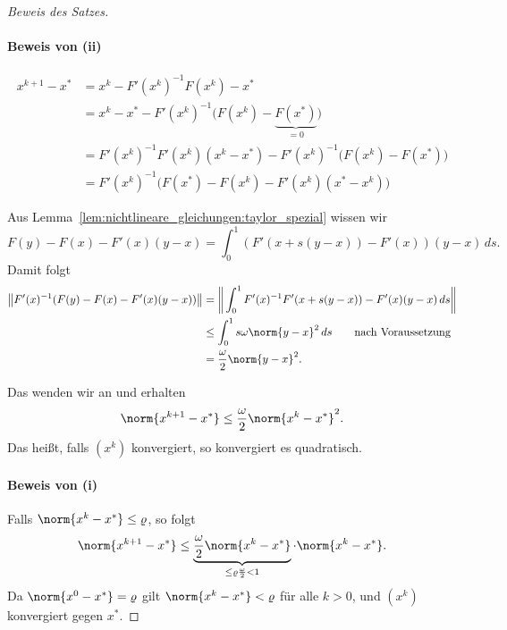 \begin{proof}[Beweis des Satzes]\mbox{}
\paragraph{Beweis von (ii)}
\begin{align*}
 x^{k+1}-x^*
 & =
 x^k- F'(x^k)^{-1} F(x^k) - x^* \\
 & =
 x^k-x^*-F'(x^k)^{-1} \Big(F(x^k)-\underbrace{F(x^*)}_{=0} \Big) \\
 & =
 F'(x^k)^{-1} F'(x^k) (x^k-x^*) - F'(x^k)^{-1} \big(F(x^k)-F(x^*) \big) \\
 & =
 F'(x^k)^{-1} \Big(F(x^*) - F(x^k) - F'(x^k) (x^*-x^k) \Big)
\end{align*}

Aus Lemma~\ref{lem:nichtlineare_gleichungen:taylor_spezial} wissen wir
\begin{equation*}
 F(y)-F(x)-F'(x)(y-x) = \int_0^1 (F'(x+s(y-x))-F'(x) )(y-x)\,ds.
\end{equation*}
Damit folgt
\begin{align*}
 \big \Vert F'(x)^{-1} (F(y)-F(x)- F'(x)(y-x) ) \big \Vert
 & =
 \bigg \Vert \int_0^1 F'(x)^{-1} F'(x+s (y-x))-F'(x) (y-x) \,ds \bigg\Vert \\
 & \leq \int_0^1 s \omega \norm{y-x}^2 \,ds \qquad \text{nach\ Voraussetzung} \\
 & = \frac{\omega}{2} \norm{y-x}^2.
\end{align*}

Das wenden wir an und erhalten
\begin{equation*}
 \norm{x^{k+1} -x^*} \leq \frac{\omega}{2} \norm{x^k-x^*}^2.
\end{equation*}
Das heißt, falls $(x^k)$ konvergiert, so konvergiert es quadratisch.

\bigskip

\paragraph{Beweis von (i)}
Falls $\norm{x^k - x^*} \le \varrho$, so folgt
\begin{equation*}
 \norm{x^{k+1}-x^*}
 \leq
 \underbrace{\frac{\omega}{2} \norm{x^k-x^*}}_{\leq \varrho \frac{\omega}{2} <1} \cdot \norm{x^k-x^*}.
\end{equation*}
Da $\norm{x^0-x^*} =\varrho$ gilt $\norm{x^k-x^*} <\varrho$ für alle $k>0$,
und $(x^k)$ konvergiert gegen $x^*$.
\end{proof}


